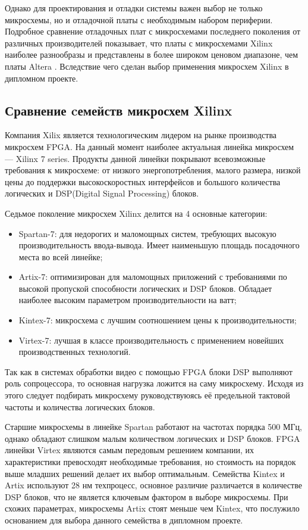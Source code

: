 Однако для проектирования и отладки системы важен выбор не только микросхемы,
но и отладочной платы с необходимым набором периферии. Подробное сравнение отладочных
плат с микросхемами последнего поколения от различных производителей показывает, что
платы с микросхемами Xilinx наиболее разнообразы и представлены в более широком ценовом диапазоне,
чем платы Altera \cite{fpga_boards_comparison}.
Вследствие чего сделан выбор применения микросхем Xilinx в дипломном проекте.

\subsection{Сравнение cемейств микросхем Xilinx}
\label{sub:domain:fpga_comparison}

Компания Xilix является технологическим лидером на рынке производства микросхем FPGA.
На данный момент наиболее актуальная линейка микросхем --- Xilinx 7 series\cite{7_series_overview}.
Продукты данной линейки покрывают всевозможные требования к микросхеме: от низкого энергопотребления, малого размера, низкой цены до
поддержки высокоскоростных интерфейсов и большого количества логических и DSP(Digital Signal Processing) блоков.

Седьмое поколение микросхем Xilinx делится на 4 основные категории:
\begin{itemize}
  \item Spartan-7: для недорогих и маломощных систем, требующих высокую производительность ввода-вывода.
    Имеет наименьшую площадь посадочного места во всей линейке;
  \item Artix-7: оптимизирован для маломощных приложений с требованиями по высокой пропуской способности логических и DSP блоков.
    Обладает наиболее высоким параметром производительности на ватт;
  \item Kintex-7: микросхема с лучшим соотношением цены к производительности;
  \item Virtex-7: лучшая в классе производительность с применением новейших производственных технологий.
\end{itemize}

Так как в системах обработки видео с помощью FPGA блоки DSP выполняют роль сопроцессора, то
основная нагрузка ложится на саму микросхему. Исходя из этого следует подбирать микросхему
руководствуюясь её предельной тактовой частоты и количества логических блоков\cite{7_series_selection_guide}.

Старшие микросхемы в линейке Spartan работают на частотах порядка 500 МГц, однако обладают слишком малым количеством
логических и DSP блоков.
FPGA линейки Virtex являются самым передовым решением компании, их характеристики превосходят необходимые требования,
но стоимость на порядок выше младших решений делает их выбор оптимальным.
Семейства Kintex и Artix используют 28 нм техпроцесс, основное различие различается в количестве DSP блоков, что не является
ключевым фактором в выборе микросхемы. При схожих параметрах, микросхемы Artix стоят меньше чем Kintex, что послужило основанием
для выбора данного семейства в дипломном проекте.

